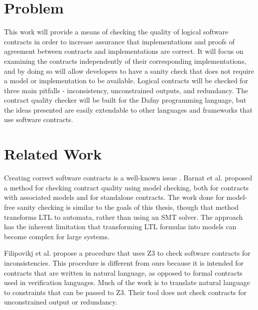 \documentclass{article}
\newif\ifcomments
\newcommand{\egm}[1]{\ifcomments\textcolor{orange}{egm: #1}\fi}
\begin{document}
\section{Problem}

This work will provide a means of checking the quality of logical software contracts in order to increase assurance
that implementations and proofs of agreement between contracts and implementations are correct. It will focus on
examining the contracts independently of their corresponding implementations, and by doing so will allow developers
to have a sanity check that does not require a model or implementation to be available. Logical contracts will be
checked for three main pitfalls - inconsistency, unconstrained outputs, and redundancy. The contract quality checker
will be built for the Dafny programming language, but the ideas presented are easily extendable to other languages
and frameworks that use software contracts.
\egm{Other frameworks and languages should be a part of the related work. These may also be mentioned in the introduction.}

\section{Related Work}

Creating correct software contracts is a well-known issue \cite{rozier2016specification} \cite{kupferman2006sanity}.
Barnat et al. \cite{barnat2012checking} \cite{barnat2016analysing} proposed a method for checking contract quality using model checking,
both for contracts with associated models and for standalone contracts. The work done for model-free sanity checking is
similar to the goals of this thesis, though that method transforms LTL to automata, rather than using an SMT solver. The approach
has the inherent limitation that transforming LTL formulas into models can become complex for large systems.

Filipovikj et al. \cite{filipovikj2017smt} propose a procedure that uses Z3 \cite{de2008z3} to check software contracts
for inconsistencies. This procedure is different from ours because it is intended for contracts that are written in
natural language, as opposed to formal contracts used in verification languages. Much of the work is to translate
natural language to constraints that can be passed to Z3. Their tool does not check contracts
for unconstrained output or redundancy.
\egm{The notion of redundancy is actually really interesting. I wonder if it might be wise to read some of the related work is logic minimization? That is used a bunch in hardware design to simplify complex predicates. Binary decision diagrams were used extensively to minimize logic for sometime. Anyways, logic minimization may be just what is needed for redundancy, and it would be some more related work.}
\end{document}
